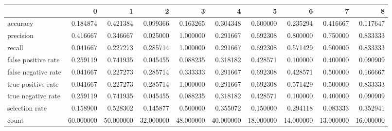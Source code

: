 \begin{tabular}{lrrrrrrrrr}
\toprule
{} &          0 &          1 &          2 &          3 &          4 &          5 &          6 &          7 &          8 \\
\midrule
accuracy            &   0.184874 &   0.421384 &   0.099366 &   0.163265 &   0.304348 &   0.600000 &   0.235294 &   0.416667 &   0.117647 \\
precision           &   0.416667 &   0.346667 &   0.025000 &   1.000000 &   0.291667 &   0.692308 &   0.800000 &   0.750000 &   0.833333 \\
recall              &   0.041667 &   0.227273 &   0.285714 &   1.000000 &   0.291667 &   0.692308 &   0.571429 &   0.500000 &   0.833333 \\
false positive rate &   0.259119 &   0.741935 &   0.045455 &   0.088235 &   0.318182 &   0.428571 &   0.100000 &   0.400000 &   0.090909 \\
false negative rate &   0.041667 &   0.227273 &   0.285714 &   0.333333 &   0.291667 &   0.692308 &   0.428571 &   0.500000 &   0.166667 \\
true positive rate  &   0.041667 &   0.227273 &   0.285714 &   1.000000 &   0.291667 &   0.692308 &   0.571429 &   0.500000 &   0.833333 \\
true negative rate  &   0.259119 &   0.741935 &   0.045455 &   0.088235 &   0.318182 &   0.428571 &   0.100000 &   0.400000 &   0.090909 \\
selection rate      &   0.158900 &   0.528302 &   0.145877 &   0.500000 &   0.355072 &   0.150000 &   0.294118 &   0.083333 &   0.352941 \\
count               &  60.000000 &  50.000000 &  32.000000 &  48.000000 &  40.000000 &  18.000000 &  14.000000 &  13.000000 &  16.000000 \\
\bottomrule
\end{tabular}
